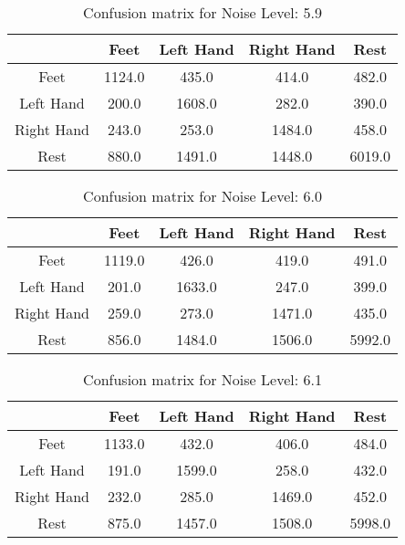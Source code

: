 \begin{table}[!htbp]
    \centering
    \begin{tabular}{|c||c|c|c|c|}
        \hline
		 & Feet & Left Hand & Right Hand & Rest \\
        \hline
        \hline
        Feet & 1124.0 & 435.0 & 414.0 & 482.0 \\
        \hline
        Left Hand & 200.0 & 1608.0 & 282.0 & 390.0 \\
        \hline
        Right Hand & 243.0 & 253.0 & 1484.0 & 458.0 \\
        \hline
        Rest & 880.0 & 1491.0 & 1448.0 & 6019.0 \\
        \hline
    \end{tabular}
    \caption{Confusion matrix for Noise Level: 5.9}
\end{table}

\begin{table}[!htbp]
    \centering
    \begin{tabular}{|c||c|c|c|c|}
        \hline
		 & Feet & Left Hand & Right Hand & Rest \\
        \hline
        \hline
        Feet & 1119.0 & 426.0 & 419.0 & 491.0 \\
        \hline
        Left Hand & 201.0 & 1633.0 & 247.0 & 399.0 \\
        \hline
        Right Hand & 259.0 & 273.0 & 1471.0 & 435.0 \\
        \hline
        Rest & 856.0 & 1484.0 & 1506.0 & 5992.0 \\
        \hline
    \end{tabular}
    \caption{Confusion matrix for Noise Level: 6.0}
\end{table}

\begin{table}[!htbp]
    \centering
    \begin{tabular}{|c||c|c|c|c|}
        \hline
		 & Feet & Left Hand & Right Hand & Rest \\
        \hline
        \hline
        Feet & 1133.0 & 432.0 & 406.0 & 484.0 \\
        \hline
        Left Hand & 191.0 & 1599.0 & 258.0 & 432.0 \\
        \hline
        Right Hand & 232.0 & 285.0 & 1469.0 & 452.0 \\
        \hline
        Rest & 875.0 & 1457.0 & 1508.0 & 5998.0 \\
        \hline
    \end{tabular}
    \caption{Confusion matrix for Noise Level: 6.1}
\end{table}

